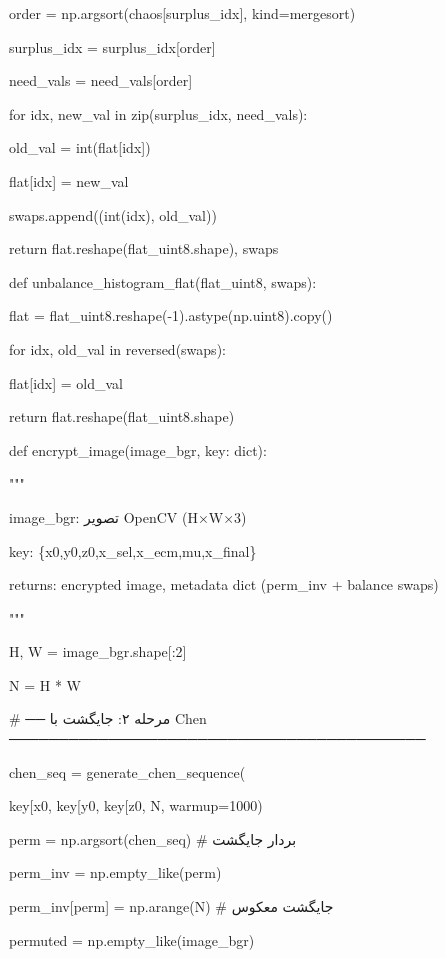 order = np.argsort(chaos{[}surplus\_idx{]}, kind=\textquotesingle mergesort\textquotesingle)

surplus\_idx = surplus\_idx{[}order{]}

need\_vals = need\_vals{[}order{]}

for idx, new\_val in zip(surplus\_idx, need\_vals):

old\_val = int(flat{[}idx{]})

flat{[}idx{]} = new\_val

swaps.append((int(idx), old\_val))

return flat.reshape(flat\_uint8.shape), swaps

def unbalance\_histogram\_flat(flat\_uint8, swaps):

flat = flat\_uint8.reshape(-1).astype(np.uint8).copy()

for idx, old\_val in reversed(swaps):

flat{[}idx{]} = old\_val

return flat.reshape(flat\_uint8.shape)

def encrypt\_image(image\_bgr, key: dict):

"""

image\_bgr: تصویر OpenCV (H×W×3)

key: \{\textquotesingle x0\textquotesingle,\textquotesingle y0\textquotesingle,\textquotesingle z0\textquotesingle,\textquotesingle x\_sel\textquotesingle,\textquotesingle x\_ecm\textquotesingle,\textquotesingle mu\textquotesingle,\textquotesingle x\_final\textquotesingle\}

returns: encrypted image, metadata dict (perm\_inv + balance swaps)

"""

H, W = image\_bgr.shape{[}:2{]}

N = H * W

\# ── مرحله ۲: جایگشت با Chen ──────────────────────────────────────────

chen\_seq = generate\_chen\_sequence(

key{[}\textquotesingle x0\textquotesingle{]}, key{[}\textquotesingle y0\textquotesingle{]}, key{[}\textquotesingle z0\textquotesingle{]}, N, warmup=1000)

perm = np.argsort(chen\_seq) \# بردار جایگشت

perm\_inv = np.empty\_like(perm)

perm\_inv{[}perm{]} = np.arange(N) \# جایگشت معکوس

permuted = np.empty\_like(image\_bgr)

